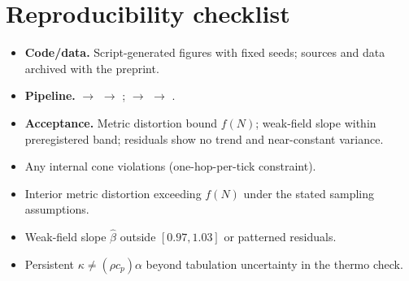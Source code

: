 \documentclass[11pt,a4paper]{article}
\begin{document}
\section*{Reproducibility checklist}
\begin{itemize}
  \item \textbf{Code/data.} Script-generated figures with fixed seeds; sources and data archived with the preprint.
  \item \textbf{Pipeline.}  $\rightarrow$  $\rightarrow$ ;  $\rightarrow$  $\rightarrow$ .
  \item \textbf{Acceptance.} Metric distortion bound $f(N)$; weak-field slope within preregistered band; residuals show no trend and near-constant variance.
\end{itemize}

\begin{tcolorbox}[title=Falsifiers (pre-registered)]
\begin{itemize}
  \item Any internal cone violations (one-hop-per-tick constraint).
  \item Interior metric distortion exceeding $f(N)$ under the stated sampling assumptions.
  \item Weak-field slope $\hat\beta$ outside $[0.97,1.03]$ or patterned residuals.
  \item Persistent $\kappa \neq (\rho c_p)\alpha$ beyond tabulation uncertainty in the thermo check.
\end{itemize}
\end{tcolorbox}

\ifwithglossary
  \printglossary[type=\acronymtype,title={Acronyms}]
  \printglossary[title={Glossary}]
\fi

\ifshowbib
  \nocite{*} %
  \printbibliography
\fi
\end{document}
